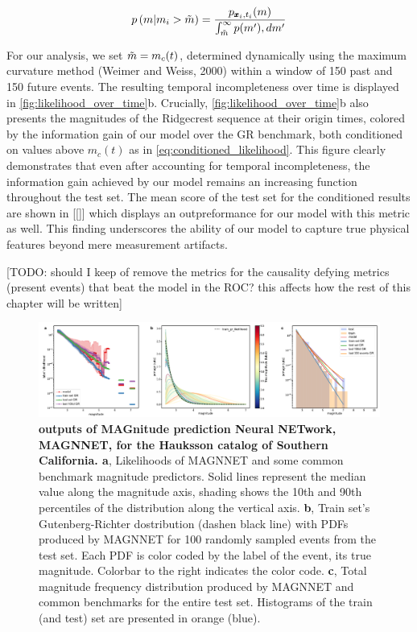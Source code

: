 \documentclass[pdflatex]{sn-jnl}
\begin{document}
\begin{equation}
    p \left( m \vert m_i > \Tilde{m} \right) = \frac{p_{\pmb{x}_i, t_i}(m)} {\int_{\Tilde{m}}^{\infty} p(m') ,dm'}
    \label{eq:conditioned_likelihood}
\end{equation}

For our analysis, we set $\Tilde{m} = m_c(t)$, determined dynamically using the maximum curvature method (Weimer and Weiss, 2000) within a window of 150 past and 150 future events. The resulting temporal incompleteness over time is displayed in \ref{fig:likelihood_over_time}b.
Crucially, \ref{fig:likelihood_over_time}b also presents the magnitudes of the Ridgecrest sequence at their origin times, colored by the information gain of our model over the GR benchmark, both conditioned on values above $m_c(t)$ as in \ref{eq:conditioned_likelihood}. This figure clearly demonstrates that even after accounting for temporal incompleteness, the information gain achieved by our model remains an increasing function throughout the test set. The mean score of the test set for the conditioned results are shown in [[]] which displays an outpreformance for our model with this metric as well. This finding underscores the ability of our model to capture true physical features beyond mere measurement artifacts.


[TODO: should I keep of remove the metrics for the causality defying metrics (present events) that beat the model in the ROC? this affects how the rest of this chapter will be written]




\begin{figure}[h!]
    \centering
    \includegraphics[width=1\textwidth]{figures/raw_results_hauksson.pdf}
    \caption{
        \textbf{outputs of MAGnitude prediction Neural NETwork, MAGNNET, for the Hauksson catalog of Southern California. a}, Likelihoods of MAGNNET and some common benchmark magnitude predictors. Solid lines represent the median value along the magnitude axis, shading shows the 10th and 90th percentiles of the distribution along the vertical axis. \textbf{b}, Train set's Gutenberg-Richter dostribution (dashen black line) with PDFs produced by MAGNNET for 100 randomly sampled events from the test set. Each PDF is color coded by the label of the event, its true magnitude. Colorbar to the right indicates the color code. \textbf{c}, Total magnitude frequency distribution produced by MAGNNET and common benchmarks for the entire test set. Histograms of the train (and test) set are presented in orange (blue).
    }
    \label{fig:architecture}
\end{figure}
\end{document}
